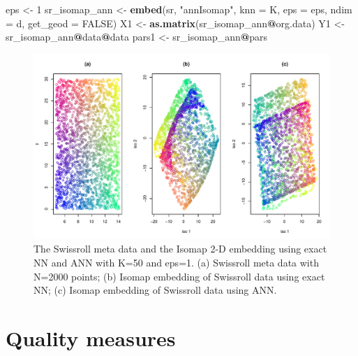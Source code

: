 \documentclass[11pt,a4paper,]{article}
\newenvironment{Shaded}{\begin{snugshade}}{\end{snugshade}}
\newcommand{\DataTypeTok}[1]{\textcolor[rgb]{0.13,0.29,0.53}{#1}}
\newcommand{\DecValTok}[1]{\textcolor[rgb]{0.00,0.00,0.81}{#1}}
\newcommand{\KeywordTok}[1]{\textcolor[rgb]{0.13,0.29,0.53}{\textbf{#1}}}
\newcommand{\NormalTok}[1]{#1}
\newcommand{\OperatorTok}[1]{\textcolor[rgb]{0.81,0.36,0.00}{\textbf{#1}}}
\newcommand{\OtherTok}[1]{\textcolor[rgb]{0.56,0.35,0.01}{#1}}
\newcommand{\StringTok}[1]{\textcolor[rgb]{0.31,0.60,0.02}{#1}}
\begin{document}
\begin{Shaded}
\begin{Highlighting}[]
\NormalTok{eps \textless{}{-}}\StringTok{ }\DecValTok{1}
\NormalTok{sr\_isomap\_ann \textless{}{-}}\StringTok{ }\KeywordTok{embed}\NormalTok{(sr, }\StringTok{"annIsomap"}\NormalTok{, }\DataTypeTok{knn =}\NormalTok{ K, }\DataTypeTok{eps =}\NormalTok{ eps, }\DataTypeTok{ndim =}\NormalTok{ d, }\DataTypeTok{get\_geod =} \OtherTok{FALSE}\NormalTok{)}
\NormalTok{X1 \textless{}{-}}\StringTok{ }\KeywordTok{as.matrix}\NormalTok{(sr\_isomap\_ann}\OperatorTok{@}\NormalTok{org.data)}
\NormalTok{Y1 \textless{}{-}}\StringTok{ }\NormalTok{sr\_isomap\_ann}\OperatorTok{@}\NormalTok{data}\OperatorTok{@}\NormalTok{data}
\NormalTok{pars1 \textless{}{-}}\StringTok{ }\NormalTok{sr\_isomap\_ann}\OperatorTok{@}\NormalTok{pars}
\end{Highlighting}
\end{Shaded}

\begin{figure}

{\centering \includegraphics[width=1\linewidth]{Simulation_files/figure-latex/mapping-1} 

}

\caption{The Swissroll meta data and the Isomap 2-D embedding using exact NN and ANN with K=50 and eps=1. (a) Swissroll meta data with N=2000 points; (b) Isomap embedding of Swissroll data using exact NN; (c) Isomap embedding of Swissroll data using ANN.}\label{fig:mapping}
\end{figure}

\hypertarget{quality-measures}{%
\section{Quality measures}\label{quality-measures}}
\end{document}

